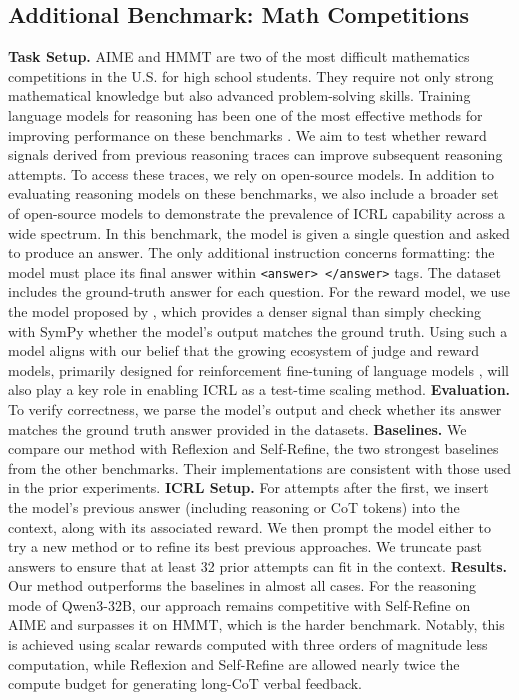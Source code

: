 \documentclass{article}
\newcommand{\0}{\mathbf{0}}
\begin{document}
\subsection{Additional Benchmark: Math Competitions}
\label{sec math}
\textbf{Task Setup.}
AIME \citep{aime} and HMMT \citep{hmmt} are two of the most difficult mathematics competitions in the U.S. for high school students. They require not only strong mathematical knowledge but also advanced problem-solving skills. Training language models for reasoning has been one of the most effective methods for improving performance on these benchmarks \citep{dsr1}.
We aim to test whether reward signals derived from previous reasoning traces can improve subsequent reasoning attempts. To access these traces, we rely on open-source models. In addition to evaluating reasoning models on these benchmarks, we also include a broader set of open-source models to demonstrate the prevalence of ICRL capability across a wide spectrum.
In this benchmark, the model is given a single question and asked to produce an answer. The only additional instruction concerns formatting: the model must place its final answer within \texttt{<answer> </answer>}  tags. The dataset includes the ground-truth answer for each question.
For the reward model, we use the model proposed by \citet{suCrossingRewardBridge2025}, which provides a denser signal than simply checking with SymPy whether the model’s output matches the ground truth. Using such a model aligns with our belief that the growing ecosystem of judge and reward models, primarily designed for reinforcement fine-tuning of language models \citep{lightman2023lets}, will also play a key role in enabling ICRL as a test-time scaling method.
\textbf{Evaluation.}
To verify correctness, we parse the model’s output and check whether its answer matches the ground truth answer provided in the datasets.
\textbf{Baselines.}
We compare our method with Reflexion and Self-Refine, the two strongest baselines from the other benchmarks. Their implementations are consistent with those used in the prior experiments.
\textbf{ICRL Setup.}
For attempts after the first, we insert the model’s previous answer (including reasoning or CoT tokens) into the context, along with its associated reward. We then prompt the model either to try a new method or to refine its best previous approaches. We truncate past answers to ensure that at least 32 prior attempts can fit in the context.
\textbf{Results.}
Our method outperforms the baselines in almost all cases. For the reasoning mode of Qwen3-32B, our approach remains competitive with Self-Refine on AIME and surpasses it on HMMT, which is the harder benchmark. Notably, this is achieved using scalar rewards computed with three orders of magnitude less computation, while Reflexion and Self-Refine are allowed nearly twice the compute budget for generating long-CoT verbal feedback.
\newpage
\end{document}
